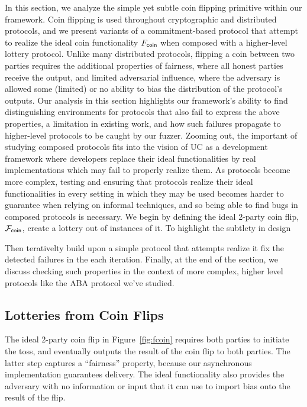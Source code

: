 In this section, we analyze the simple yet subtle coin flipping primitive
within our framework.  Coin flipping is used throughout cryptographic and
distributed protocols, and we present variants of a commitment-based protocol
that attempt to realize the ideal coin functionality $F_{{\mathsf {coin}}}$ when composed
with a higher-level lottery protocol.  Unlike many distributed protocols,
flipping a coin between two parties requires the additional properties of
fairness, where all honest parties receive the output, and limited adversarial
influence, where the adversary is allowed some (limited) or no ability to bias the
distribution of the protocol's outputs.  Our analysis in this section
highlights our framework's ability to find distinguishing environments for
protocols that also fail to express the above properties, a limitation in
existing work, and how such failures propagate to higher-level protocols to be
caught by our fuzzer.  Zooming out, the important of studying composed
protocols fits into the vision of UC as a development framework where
developers replace their ideal functionalities by real implementations which
may fail to properly realize them.  As protocols become more complex, testing
and ensuring that protocols realize their ideal functionalities in every
setting in which they may be used becomes harder to guarantee when relying on
informal techniques, and so being able to find bugs in composed protocols is
necessary.  We begin by defining the ideal 2-party coin flip, $\mathcal{F}_{{\mathsf {coin}}}$,
create a lottery out of instances of it.
To highlight the subtlety in design 

Then terativelty build upon a simple
protocol that attempts realize it fix the detected failures in the each
iteration.  Finally, at the end of the section, we discuss checking such
properties in the context of more complex, higher level protocols like the ABA
protocol we've studied.

\subsection{Lotteries from Coin Flips}
The ideal 2-party coin flip in Figure~\ref{fig:fcoin} requires both parties to
initiate the toss, and eventually outputs the result of the coin flip to both
parties.  The latter step captures a ``fairness'' property, because our
asynchronous implementation guarantees delivery.  The ideal functionality also
provides the adversary with no information or input that it can use to import
bias onto the result of the flip.

